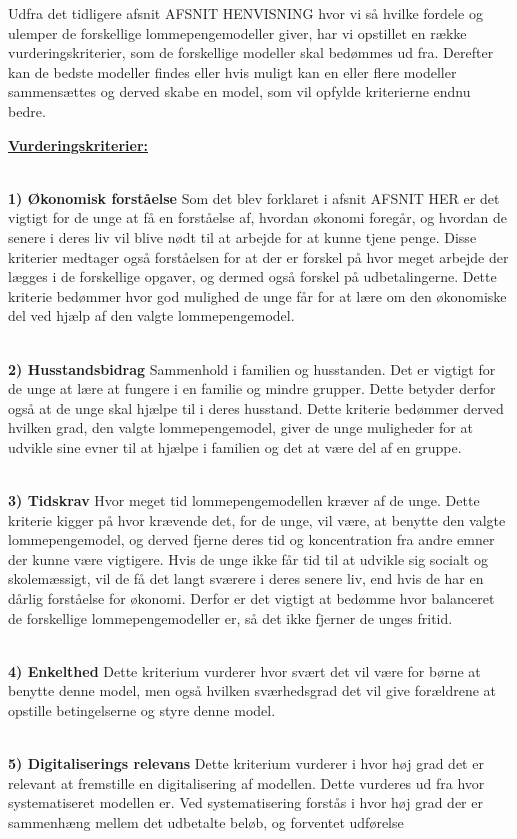 Udfra det tidligere afsnit AFSNIT HENVISNING hvor vi så hvilke fordele og ulemper de forskellige lommepengemodeller giver, har vi opstillet en række vurderingskriterier, som de forskellige modeller skal bedømmes ud fra. Derefter kan de bedste modeller findes eller hvis muligt kan en eller flere modeller sammensættes og derved skabe en model, som vil opfylde kriterierne endnu bedre.

\uline{\textbf{Vurderingskriterier:}}

\\\textbf{1) Økonomisk forståelse}
Som det blev forklaret i afsnit AFSNIT HER er det vigtigt for de unge at få en forståelse af, hvordan økonomi foregår, og hvordan de senere i deres liv vil blive nødt til at arbejde for at kunne tjene penge. 
Disse kriterier medtager også forståelsen for at der er forskel på hvor meget arbejde der lægges i de forskellige opgaver, og dermed også forskel på udbetalingerne.
Dette kriterie bedømmer hvor god mulighed de unge får for at lære om den økonomiske del ved hjælp af den valgte lommepengemodel.

\\\textbf{2) Husstandsbidrag}
Sammenhold i familien og husstanden. 
Det er vigtigt for de unge at lære at fungere i en familie og mindre grupper. Dette betyder derfor også at de unge skal hjælpe til i deres husstand.
Dette kriterie bedømmer derved hvilken grad, den valgte lommepengemodel, giver de unge muligheder for at udvikle sine evner til at hjælpe i familien og det at være del af en gruppe.

\\\textbf{3) Tidskrav}
Hvor meget tid lommepengemodellen kræver af de unge.
Dette kriterie kigger på hvor krævende det, for de unge, vil være, at benytte den valgte lommepengemodel, og derved fjerne deres tid og koncentration fra andre emner der kunne være vigtigere. Hvis de unge ikke får tid til at udvikle sig socialt og skolemæssigt, vil de få det langt sværere i deres senere liv, end hvis de har en dårlig forståelse for økonomi.
Derfor er det vigtigt at bedømme hvor balanceret de forskellige lommepengemodeller er, så det ikke fjerner de unges fritid.

\\\textbf{4) Enkelthed}
Dette kriterium vurderer hvor svært det vil være for børne at benytte denne model, men også hvilken sværhedsgrad det vil give forældrene at opstille betingelserne og styre denne model.

\\\textbf{5) Digitaliserings relevans}
Dette kriterium vurderer i hvor høj grad det er relevant at fremstille en digitalisering af modellen. Dette vurderes ud fra hvor systematiseret modellen er. Ved systematisering forstås i hvor høj grad der er sammenhæng mellem det udbetalte beløb, og forventet udførelse%

